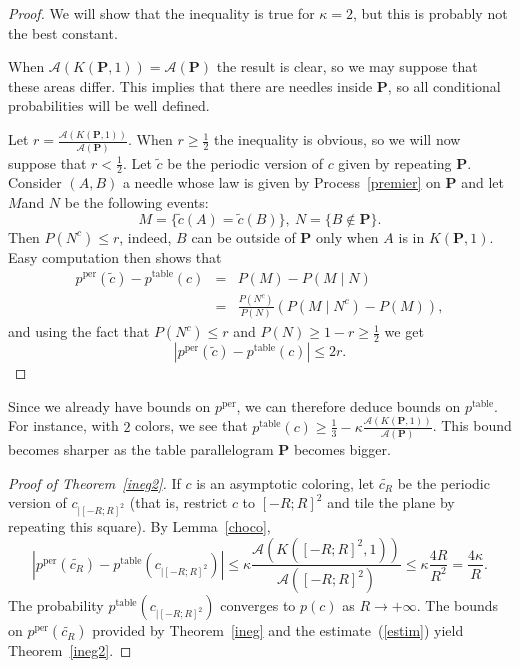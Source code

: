 \documentclass[a4paper,11pt]{article}
\theoremstyle{definition}
\theoremstyle{remark}
\renewcommand{\P}{\mathbf{P}}
\newcommand{\pper}{p^{\mathrm{per}}}
\newcommand{\ptable}{p^{\mathrm{table}}}
\begin{document}
\begin{proof}
We will show that the inequality is true for $\kappa =2$, but this is probably 
not the best constant.

When $\mathcal{A}(K(\mathbf{P},1)) = \mathcal{A}(\mathbf{P})$ the result is clear,
so we may suppose that these areas differ. This implies that there are needles 
inside $\P$, so all conditional probabilities will be well defined.

Let $r = \frac{\mathcal{A}(K(\mathbf{P},1))}{\mathcal{A}(\mathbf{P})}$. When 
$r \geq \frac12$ the inequality is obvious, so we will now suppose that 
$r < \frac12$. Let $\tilde{c}$ be the periodic version of
$c$ given by repeating $\P$. Consider $(A,B)$ a needle whose law is given by Process~\ref{premier} on $\P$ and let $M$and $N$ be the following events:
$$ M = \{\tilde{c} (A) = \tilde{c} (B) \}, \ N = \{B\notin \P \}.$$
Then $P(N^c) \leq r$, indeed, $B$ can 
be outside of $\mathbf{P}$ only
when $A$ is in $K(\mathbf{P},1)$. Easy computation then shows that
\begin{eqnarray*}
\pper(\tilde{c}) - \ptable(c) & = & P(M) - P(M \mid N) \\
& = & \frac{P(N^c)}{P(N)} \left( P(M\mid N^c) - P(M)\right),
\end{eqnarray*}
and using the fact that $P(N^c) \leq r$ and 
$P(N) \geq 1-r \geq \frac12$ we get 
$$ |\pper(\tilde{c}) - \ptable(c)| \leq 2r.$$
\end{proof}

Since we already have bounds on $\pper$, we can therefore deduce bounds on $\ptable$.
For instance, with $2$ colors, we see that 
$\ptable(c) \geq \frac13 - \kappa \frac{\mathcal{A}(K(\mathbf{P},1))}{\mathcal{A}(\mathbf{P})}$. 
This bound becomes sharper as the table parallelogram $\mathbf{P}$ becomes bigger.
\begin{proof}[Proof of Theorem~\ref{ineg2}]
If $c$ is an asymptotic coloring, let $\tilde{c_R}$ be the periodic version of $c_{|[-R;R]^2}$ (that is, restrict $c$ to $[-R;R]^2$ and tile the plane by repeating this square). By Lemma~\ref{choco},
\begin{equation} \label{estim}
|\pper(\tilde{c_R}) - \ptable(c_{|[-R;R]^2}) | \leq \kappa \frac{\mathcal{A}(K([-R;R]^2,1))}{\mathcal{A}([-R;R]^2)} \leq \kappa \frac{4R}{R^2} = \frac{4\kappa}{R}.
\end{equation}
The probability $\ptable(c_{|[-R;R]^2})$ converges to $p(c)$ as $R\rightarrow +\infty$. The bounds on $\pper(\tilde{c_R})$ provided by Theorem~\ref{ineg} and the estimate~(\ref{estim}) yield Theorem~\ref{ineg2}.
\end{proof}
\end{document}
